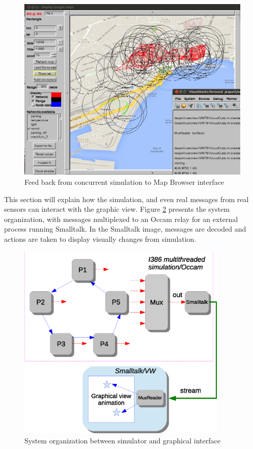 \begin{figure}[hbtp]
\begin{center}
\leavevmode 
\includegraphics[width=12cm] {netSimul.png}
\caption{Feed back from concurrent simulation to Map Browser interface}
\label{fig:netSimul}
\end{center}
\end{figure}
 

This section will explain how the simulation, and even real messages from real sensors
can interact with the graphic view. Figure \ref{fig:mux4-st} presents the system organization, with
messages multiplexed to an Occam relay for an external process running Smalltalk.
In the Smalltalk image, messages are decoded and actions are taken to display visually
changes from simulation.

\begin{figure}[hbtp]
\begin{center} 
\includegraphics[width=10cm] {mux4-st.eps}
\caption{System organization between simulator and graphical interface}
\label{fig:mux4-st}
\end{center}
\end{figure}
 

